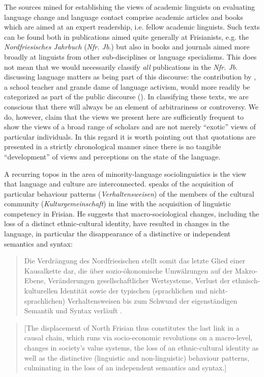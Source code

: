 \documentclass[output=paper]{langsci/langscibook}
\begin{document}
The sources mined for establishing the views of academic linguists on evaluating language change and language contact comprise academic articles and books which are aimed at an expert readership, i.e. fellow academic linguists. Such texts can be found both in publications aimed quite generally at Frisianists, e.g. the \textit{Nordfriesisches Jahrbuch} (\textit{Nfr. Jb}.) but also in books and journals aimed more broadly at linguists from other sub-disciplines or language specialisms. This does not mean that we would necessarily classify \textit{all} publications in the \textit{Nfr. Jb.} discussing language matters as being part of this discourse: the contribution by \citet{Ingwersen1966}, a school teacher and grande dame of language activism, would more readily be categorized as part of the public discourse (). In classifying these texts, we are conscious that there will always be an element of arbitrariness or controversy. We do, however, claim that the views we present here are sufficiently frequent to show the views of a broad range of scholars and are not merely “exotic” views of particular individuals. In this regard it is worth pointing out that quotations are presented in a strictly chronological manner since there is no tangible “development” of views and perceptions on the state of the language. 

A recurring topos in the area of minority-language sociolinguistics is the view that language and culture are interconnected. \citet[473]{Sjolin1997} speaks of the acquisition of particular behaviour patterns (\textit{Verhaltensweisen}) of the members of the cultural community (\textit{Kulturgemeinschaft}) in line with the acquisition of linguistic competency in Frisian. He suggests that macro-sociological changes, including the loss of a distinct ethnic-cultural identity, have resulted in changes in the language, in particular the disappearance of a distinctive or independent semantics and syntax: 

\begin{quote}
Die Verdrängung des Nordfriesischen stellt somit das letzte Glied einer Kausalkette dar, die über sozio-ökonomische Umwälzungen auf der Makro-Ebene, Veränderungen gesellschaftlicher Wertsysteme, Verlust der ethnisch-kulturellen Identität sowie der typischen (sprachlichen und nicht-sprachlichen) Verhaltensweisen bis zum Schwund der eigenständigen Semantik und Syntax verläuft \citep[473]{Sjolin1997}.
\end{quote}

\begin{quote}
[The displacement of North Frisian thus constitutes the last link in a causal chain, which runs via socio-economic revolutions on a macro-level, changes in society’s value systems, the loss of an ethnic-cultural identity as well as the distinctive (linguistic and non-linguistic) behaviour patterns, culminating in the loss of an independent semantics and syntax.]
\end{quote}
\end{document}
